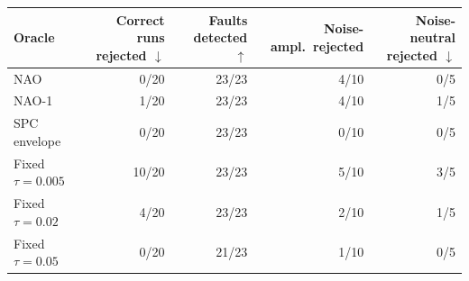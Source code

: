 \begin{tabular}{lrrrr}
\toprule
\textbf{Oracle} & \textbf{Correct runs rejected $\downarrow$} & \textbf{Faults detected $\uparrow$} & \textbf{Noise-ampl.\ rejected} & \textbf{Noise-neutral rejected $\downarrow$} \\
\midrule
NAO & 0/20 & 23/23 & 4/10 & 0/5 \\
NAO-1 & 1/20 & 23/23 & 4/10 & 1/5 \\
SPC envelope & 0/20 & 23/23 & 0/10 & 0/5 \\
Fixed $\tau = 0.005$ & 10/20 & 23/23 & 5/10 & 3/5 \\
Fixed $\tau = 0.02$ & 4/20 & 23/23 & 2/10 & 1/5 \\
Fixed $\tau = 0.05$ & 0/20 & 21/23 & 1/10 & 0/5 \\
\bottomrule
\end{tabular}
